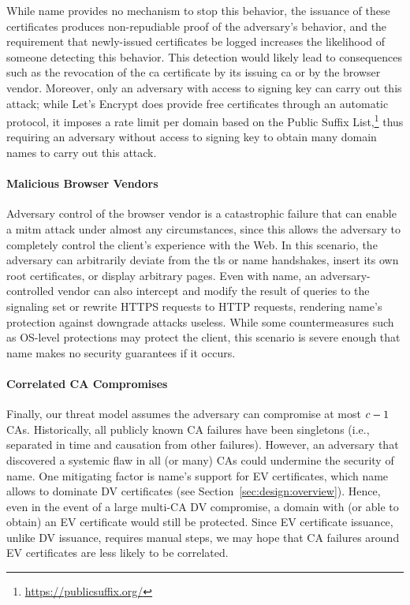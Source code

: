 While \ac{name} provides no mechanism to stop this behavior, the issuance of
these certificates produces non-repudiable proof of the adversary's behavior,
and the requirement that newly-issued certificates be logged increases the
likelihood of someone detecting this behavior. This detection would likely lead
to consequences such as the revocation of the \ac{ca} certificate by its issuing
\ac{ca} or by the browser vendor. Moreover, only an adversary with access to
 signing key can carry out this attack; while Let's Encrypt does provide
free certificates through an automatic protocol, it imposes a rate limit per
domain based on the Public Suffix
List,\footnote{\url{https://publicsuffix.org/}} thus requiring an adversary
without access to  signing key to obtain many domain names to carry out
this attack.

\paragraph{Malicious Browser Vendors}

Adversary control of the browser vendor is a catastrophic failure that can
enable a \ac{mitm} attack under almost any circumstances, since this allows the
adversary to completely control the client's experience with the Web. In this
scenario, the adversary can arbitrarily deviate from the \ac{tls} or \ac{name}
handshakes, insert its own root certificates, or display arbitrary pages. Even
with \ac{name}, an adversary-controlled vendor can also intercept and modify the
result of queries to the signaling set or rewrite HTTPS requests to HTTP
requests, rendering \ac{name}'s protection against downgrade attacks useless.
While some countermeasures such as OS-level protections may protect the client,
this scenario is severe enough that \ac{name} makes no security guarantees if it
occurs.

\paragraph{Correlated CA Compromises}

Finally, our threat model assumes the adversary can compromise at most $c-1$
CAs. Historically, all publicly known CA failures have been singletons (i.e.,
separated in time and causation from other failures).  However, an adversary that discovered
a systemic flaw in all (or many) CAs could undermine the security of \ac{name}.
One mitigating factor is \ac{name}'s support for EV certificates,
which \ac{name} allows to dominate DV certificates (see Section~\ref{sec:design:overview}).
Hence, even in the event of a large multi-CA DV compromise,
a domain with (or able to obtain) an EV certificate would still be protected.
Since EV certificate issuance, unlike DV issuance, requires manual steps,
we may hope that CA failures around EV certificates are less likely to be correlated.
